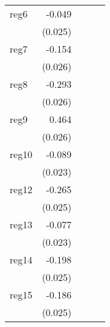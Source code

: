 {\begin{longtable}{l*{4}{D{.}{.}{-1}}}
\addlinespace
reg6        &      -0.049         &                     &                     &                     \\
            &     (0.025)         &                     &                     &                     \\
\addlinespace
reg7        &      -0.154\sym{***}&                     &                     &                     \\
            &     (0.026)         &                     &                     &                     \\
\addlinespace
reg8        &      -0.293\sym{***}&                     &                     &                     \\
            &     (0.026)         &                     &                     &                     \\
\addlinespace
reg9        &       0.464\sym{***}&                     &                     &                     \\
            &     (0.026)         &                     &                     &                     \\
\addlinespace
reg10       &      -0.089\sym{***}&                     &                     &                     \\
            &     (0.023)         &                     &                     &                     \\
\addlinespace
reg12       &      -0.265\sym{***}&                     &                     &                     \\
            &     (0.025)         &                     &                     &                     \\
\addlinespace
reg13       &      -0.077\sym{***}&                     &                     &                     \\
            &     (0.023)         &                     &                     &                     \\
\addlinespace
reg14       &      -0.198\sym{***}&                     &                     &                     \\
            &     (0.025)         &                     &                     &                     \\
\addlinespace
reg15       &      -0.186\sym{***}&                     &                     &                     \\
            &     (0.025)         &                     &                     &                     \\

\end{longtable}}
